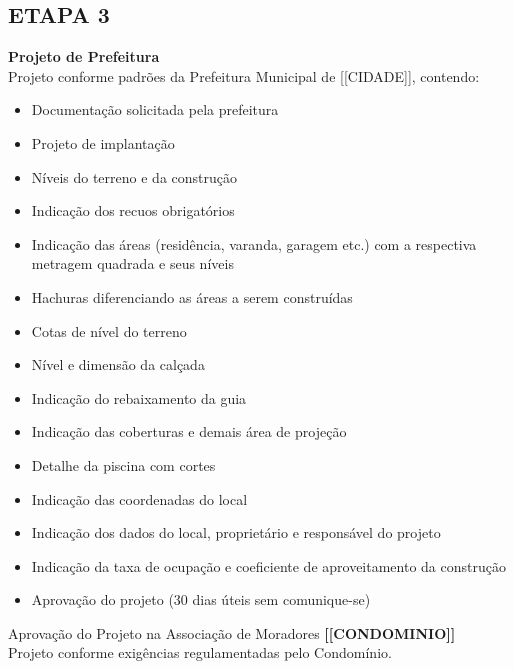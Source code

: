 \documentclass[11pt,a4paper]{article}
\begin{document}
\vspace{0.5cm}
\begin{minipage}{\textwidth}
\subsection*{ETAPA 3}
\textbf{Projeto de Prefeitura} \\
Projeto conforme padrões da Prefeitura Municipal de [[CIDADE]], contendo:
\begin{itemize}
    \item Documentação solicitada pela prefeitura
    \item Projeto de implantação
    \item Níveis do terreno e da construção
    \item Indicação dos recuos obrigatórios
    \item Indicação das áreas (residência, varanda, garagem etc.) com a respectiva metragem quadrada e seus níveis
    \item Hachuras diferenciando as áreas a serem construídas
    \item Cotas de nível do terreno
    \item Nível e dimensão da calçada
    \item Indicação do rebaixamento da guia
    \item Indicação das coberturas e demais área de projeção
    \item Detalhe da piscina com cortes
    \item Indicação das coordenadas do local
    \item Indicação dos dados do local, proprietário e responsável do projeto
    \item Indicação da taxa de ocupação e coeficiente de aproveitamento da construção
    \item Aprovação do projeto (30 dias úteis sem comunique-se)
\end{itemize}

\vspace{0.2cm}
\noindent Aprovação do Projeto na Associação de Moradores \textbf{[[CONDOMINIO]]} \\
Projeto conforme exigências regulamentadas pelo Condomínio.
\end{minipage}
\end{document}
